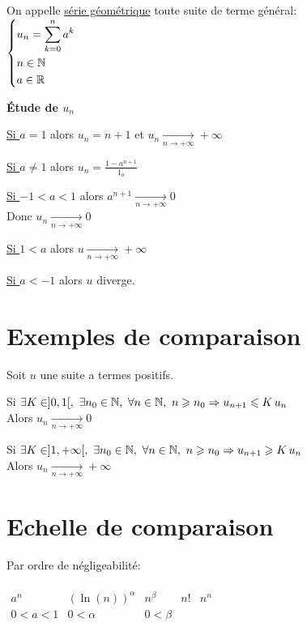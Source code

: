 \documentclass[12pt,twoside,a4paper]{article}
\begin{document}
		\begin{defi}
			On appelle \underline{s\'erie g\'eom\'etrique} toute suite de terme g\'en\'eral:\\
			$\left\{\begin{aligned}& u_n=\sum\limits_{k=0}^na^k\\& n\in\mathbb{N}\\& a\in\mathbb{R}\end{aligned}\right.$
		\end{defi}
		\begin{flushleft}
			\textbf{\'Etude de $u_n$}\\
			\begin{liste}
				\item \underline{Si $a=1$} alors $u_n=n+1$ et $u_n\mathop{\longrightarrow}\limits_{n\rightarrow+\infty}+\infty$
				\item \underline{Si $a\neq1$} alors $u_n=\frac{1-a^{n+1}}{1_a}$
					\begin{liste}
						\item \underline{Si $-1<a<1$} alors $a^{n+1}\mathop{\longrightarrow}\limits_{n\rightarrow+\infty}0$\\
							Donc $u_n\mathop{\longrightarrow}\limits_{n\rightarrow+\infty}0$
						\item \underline{Si $1<a$} alors $u\mathop{\longrightarrow}\limits_{n\rightarrow+\infty}+\infty$
						\item \underline{Si $a<-1$} alors $u$ diverge.
					\end{liste}
			\end{liste}
		\end{flushleft}
	\section{Exemples de comparaison}
		\begin{flushleft}
			Soit $u$ une suite a termes positifs.\\
			\begin{liste}
				\item Si $\exists K\in]0,1[,\ \exists n_0\in\N,\ \forall n\in\N,\ n\geqslant n_0\Rightarrow u_{n+1}\leqslant K\,u_n$\\
					Alors $u_n\mathop{\longrightarrow}\limits_{n\rightarrow+\infty}0$
				\item Si $\exists K\in]1,+\infty[,\ \exists n_0\in\mathbb{N},\ \forall n\in\mathbb{N},\ n\geqslant n_0\Rightarrow u_{n+1}\geqslant K\,u_n$\\
					Alors $u_n\mathop{\longrightarrow}\limits_{n\rightarrow+\infty}+\infty$
			\end{liste}
		\end{flushleft}
	\section{Echelle de comparaison}
		Par ordre de n\'egligeabilit\'e:\\\\
		$\begin{array}{c|c|c|c|c}
			a^n & (\ln(n))^\alpha & n^\beta & n! & n^n \\ 
			0<a<1 & 0<\alpha & 0<\beta &  & 
		\end{array}$ 
		
\end{document}
